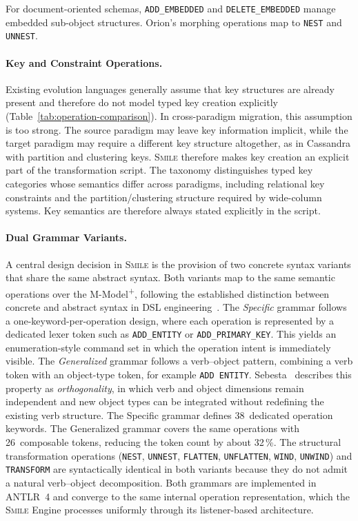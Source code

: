 \documentclass{llncs}
\begin{document}
For document-oriented schemas, \texttt{ADD\_EMBEDDED} and \texttt{DELETE\_\allowbreak{}EMBEDDED} manage embedded sub-object structures. Orion's morphing operations map to \texttt{NEST} and \texttt{UNNEST}.


\paragraph{Key and Constraint Operations.}
Existing evolution languages generally assume that key structures are already present and therefore do not model typed key creation explicitly (Table~\ref{tab:operation-comparison}). In cross-paradigm migration, this assumption is too strong. The source paradigm may leave key information implicit, while the target paradigm may require a different key structure altogether, as in Cassandra with partition and clustering keys. \textsc{Smile} therefore makes key creation an explicit part of the transformation script. The taxonomy distinguishes typed key categories whose semantics differ across paradigms, including relational key constraints and the partition/clustering structure required by wide-column systems. Key semantics are therefore always stated explicitly in the script.

\paragraph{Dual Grammar Variants.}
A central design decision in \textsc{Smile} is the provision of two concrete syntax variants that share the same abstract syntax.
Both variants map to the same semantic operations over the M-Model\textsuperscript{+}, following the established distinction between concrete and abstract syntax in DSL engineering~\cite{mernik2005and,fowler2010addison}. The \emph{Specific} grammar follows a one-keyword-per-operation design, where each operation is represented by a dedicated lexer token such as \texttt{ADD\_ENTITY} or \texttt{ADD\_PRIMARY\_KEY}.
This yields an enumeration-style command set in which the operation intent is immediately visible. The \emph{Generalized} grammar follows a verb--object pattern, combining a verb token with an object-type token, for example \texttt{ADD ENTITY}. Sebesta~\cite{sebesta2016concepts} describes this property as \emph{orthogonality}, in which verb and object dimensions remain independent and new object types can be integrated without redefining the existing verb structure. The Specific grammar defines 38~dedicated operation keywords.
The Generalized grammar covers the same operations with 26~composable tokens, reducing the token count by about 32\,\%. The structural transformation operations (\texttt{NEST}, \texttt{UNNEST}, \texttt{FLATTEN}, \texttt{UNFLATTEN}, \texttt{WIND}, \texttt{UNWIND}) and \texttt{TRANSFORM} are syntactically identical in both variants because they do not admit a natural verb--object decomposition. Both grammars are implemented in ANTLR~4 and converge to the same internal operation representation, which the \textsc{Smile} Engine processes uniformly through its listener-based architecture.
\end{document}

